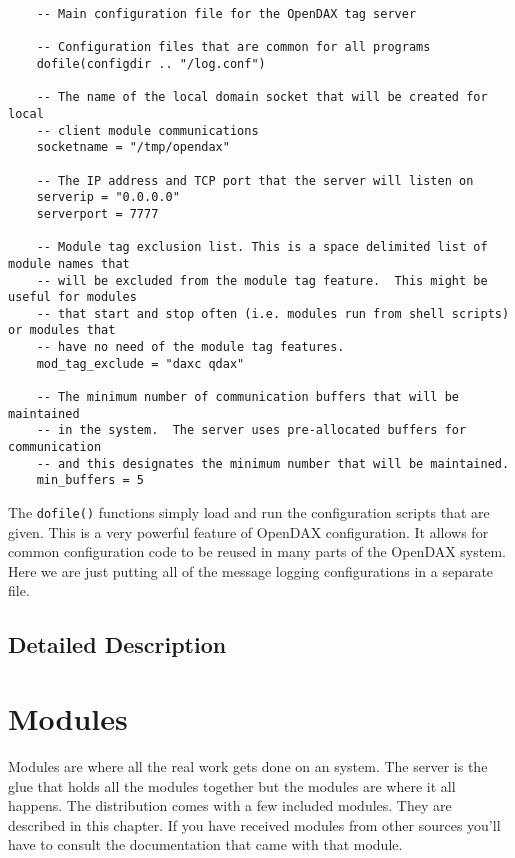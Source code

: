 	\begin{verbatim}
	-- Main configuration file for the OpenDAX tag server

	-- Configuration files that are common for all programs
	dofile(configdir .. "/log.conf")

	-- The name of the local domain socket that will be created for local
	-- client module communications
	socketname = "/tmp/opendax"

	-- The IP address and TCP port that the server will listen on
	serverip = "0.0.0.0"
	serverport = 7777

	-- Module tag exclusion list. This is a space delimited list of module names that
	-- will be excluded from the module tag feature.  This might be useful for modules
	-- that start and stop often (i.e. modules run from shell scripts) or modules that
	-- have no need of the module tag features.
	mod_tag_exclude = "daxc qdax"

	-- The minimum number of communication buffers that will be maintained
	-- in the system.  The server uses pre-allocated buffers for communication
	-- and this designates the minimum number that will be maintained.
	min_buffers = 5

	\end{verbatim}

	The \texttt{dofile()} functions simply load and run the configuration scripts
	that are given.  This is a very powerful feature of OpenDAX configuration.  It
	allows for common configuration code to be reused in many parts of the OpenDAX
	system.  Here we are just putting all of the message logging configurations in a
	separate file.

    \section{Detailed Description}



	\chapter{Modules}
	Modules are where all the real work gets done on an \opendax system.  The server
	is the glue that holds all the modules together but the modules are where it all
	happens.  The \opendax distribution comes with a few included modules.  They are
	described in this chapter.  If you have received modules from other sources
	you'll have to consult the documentation that came with that module.

